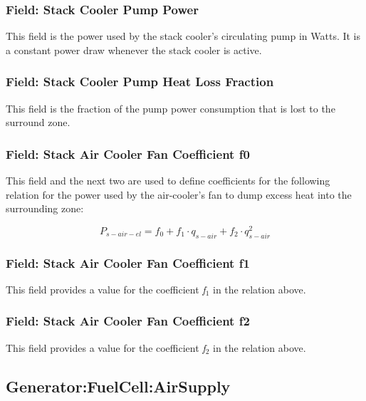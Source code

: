 \subsubsection{Field: Stack Cooler Pump Power}\label{field-stack-cooler-pump-power}

This field is the power used by the stack cooler's circulating pump in Watts. It is a constant power draw whenever the stack cooler is active.

\subsubsection{Field: Stack Cooler Pump Heat Loss Fraction}\label{field-stack-cooler-pump-heat-loss}

This field is the fraction of the pump power consumption that is lost to the surround zone.

\subsubsection{Field: Stack Air Cooler Fan Coefficient f0}\label{field-stack-air-cooler-fan-coefficient-f0}

This field and the next two are used to define coefficients for the following relation for the power used by the air-cooler's fan to dump excess heat into the surrounding zone:

\begin{equation}
{P_{s - air - el}} = {f_0} + {f_1} \cdot {q_{s - air}} + {f_2} \cdot q_{s - air}^2
\end{equation}

\subsubsection{Field: Stack Air Cooler Fan Coefficient f1}\label{field-stack-air-cooler-fan-coefficient-f1}

This field provides a value for the coefficient \emph{f\(_{1}\)} in the relation above.

\subsubsection{Field: Stack Air Cooler Fan Coefficient f2}\label{field-stack-air-cooler-fan-coefficient-f2}

This field provides a value for the coefficient \emph{f\(_{2}\)} in the relation above.

\subsection{Generator:FuelCell:AirSupply}\label{generatorfuelcellairsupply}

